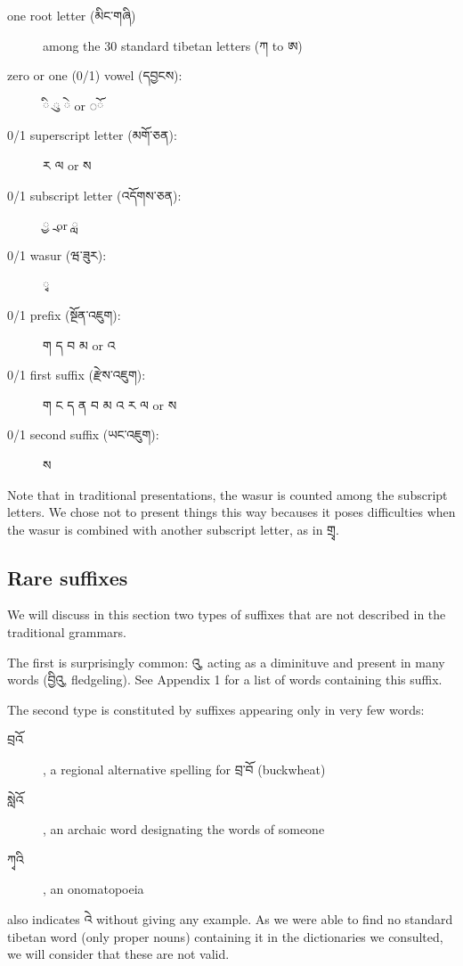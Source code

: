 \documentclass[%
a4paper,%
pagesize,%
12pt,%
parskip=off,%
bibliography=totoc,%
numbers=noenddot,%
DIV=12,%
twoside=semi,%
headings=normal%
]{scrartcl}
\begin{document}
\begin{description}
  \item[one root letter (མིང་གཞི)] among the 30 standard tibetan letters (ཀ to ཨ)
  \item[zero or one (0/1) vowel (དབྱངས):] {\tibetanfont ◌}ི {\tibetanfont ◌\kern 0.5mm}ུ {\tibetanfont ◌}ེ or {\tibetanfont ◌}ོ
  \item[0/1 superscript letter (མགོ་ཅན):] ར ལ or ས
  \item[0/1 subscript letter (འདོགས་ཅན):] ྱ ྲ or ླ
  \item[0/1 wasur (ཝ་ཟུར):] ྭ
  \item[0/1 prefix (སྔོན་འཇུག):] ག ད བ མ or འ
  \item[0/1 first suffix (རྫེས་འཇུག):] ག ང ད ན བ མ འ ར ལ or ས
  \item[0/1 second suffix (ཡང་འཇུག):] ས
\end{description}

Note that in traditional presentations, the wasur is counted among the subscript letters. We chose not to present things this way becauses it poses difficulties when the wasur is combined with another subscript letter, as in གྲྭ.

\subsection{Rare suffixes}

We will discuss in this section two types of suffixes that are not described in the traditional grammars.

The first is surprisingly common: འུ, acting as a diminituve and present in many words (བྱིའུ, fledgeling). See Appendix 1 for a list of words containing this suffix.

The second type is constituted by suffixes appearing only in very few words:

\begin{description}
\item[བྲའོ], a regional alternative spelling for བྲ་བོ (buckwheat)
\item[སླེའོ], an archaic word designating the words of someone
\item[ཀྭའི], an onomatopoeia
\end{description}

\cite{TournadreMST} also indicates འེ without giving any example. As we were able to find no standard tibetan word (only proper nouns) containing it in the dictionaries we consulted, we will consider that these are not valid.
\end{document}
